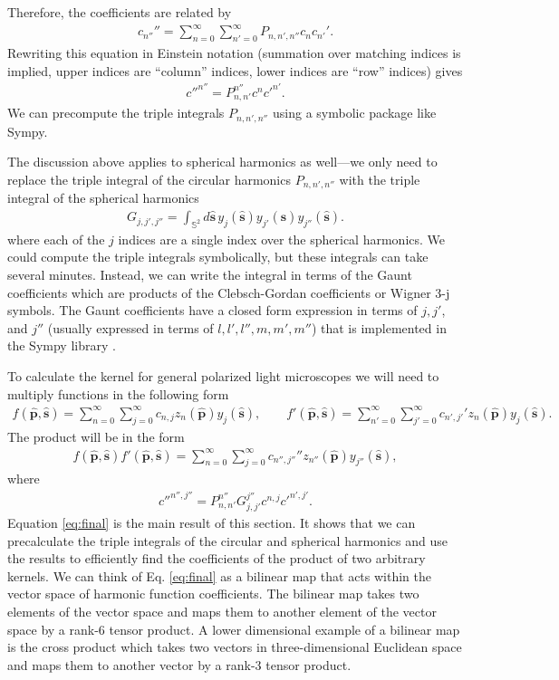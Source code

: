\documentclass[11pt]{article}
\providecommand{\mh}[1]{\mathbf{\hat{#1}}}
\providecommand{\mbb}[1]{\mathbb{#1}}
\begin{document}
  Therefore, the coefficients are related by
  \begin{align}
    c_{n''}'' = \sum_{n=0}^\infty \sum_{n'=0}^\infty P_{n,n',n''} c_n c_{n'}'.
  \end{align}
  Rewriting this equation in Einstein notation (summation over matching indices
  is implied, upper indices are ``column'' indices, lower indices are ``row''
  indices) gives
  \begin{align}
    {c''}^{n''} = P^{n''}_{n,n'} c^n {c'}^{n'}.
  \end{align}
  We can precompute the triple integrals $P_{n,n',n''}$ using a symbolic package
  like Sympy.
  
  The discussion above applies to spherical harmonics as well---we only need to replace
  the triple integral of the circular harmonics $P_{n,n',n''}$ with the triple integral
  of the spherical harmonics
  \begin{align}
    G_{j,j',j''} = \int_{\mbb{S}^2}d\mh{s}\, y_{j}(\mh{s})y_{j'}(\mh{s})y_{j''}(\mh{s}).
  \end{align}
  where each of the $j$ indices are a single index over the spherical harmonics.
  We could compute the triple integrals symbolically, but these integrals can
  take several minutes. Instead, we can write the integral in terms of the Gaunt
  coefficients \cite{homeier1996} which are products of the Clebsch-Gordan
  coefficients or Wigner 3-j symbols. The Gaunt coefficients have a closed form
  expression in terms of $j,j'$, and $j''$ (usually expressed in terms of
  $l,l',l'',m,m',m''$) that is implemented in the Sympy library \cite{sympy}.

  To calculate the kernel for general polarized light microscopes we will need to multiply functions in the following form
  \begin{align}
  f(\mh{p}, \mh{s}) = \sum_{n=0}^\infty\sum_{j=0}^\infty c_{n,j} z_n(\mh{p})y_j(\mh{s}), \qquad f'(\mh{p}, \mh{s}) = \sum_{n'=0}^\infty\sum_{j'=0}^\infty c_{n',j'}' z_n(\mh{p})y_j(\mh{s}).
\end{align}
The product will be in the form
\begin{align}
  f(\mh{p}, \mh{s})f'(\mh{p}, \mh{s}) = \sum_{n=0}^\infty\sum_{j=0}^\infty c_{n'',j''}'' z_{n''}(\mh{p})y_{j''}(\mh{s}),
\end{align}
where
\begin{align}
  {c''}^{n'', j''} = P_{n,n'}^{n''} G_{j,j'}^{j''} c^{n,j} {c'}^{n', j'}.\label{eq:final}
\end{align}
Equation \ref{eq:final} is the main result of this section. It shows that we can
precalculate the triple integrals of the circular and spherical harmonics and
use the results to efficiently find the coefficients of the product of two
arbitrary kernels. We can think of Eq. \ref{eq:final} as a bilinear map that
acts within the vector space of harmonic function coefficients. The bilinear map
takes two elements of the vector space and maps them to another element of the
vector space by a rank-6 tensor product. A lower dimensional example of a
bilinear map is the cross product which takes two vectors in three-dimensional
Euclidean space and maps them to another vector by a rank-3 tensor product.
\end{document}
